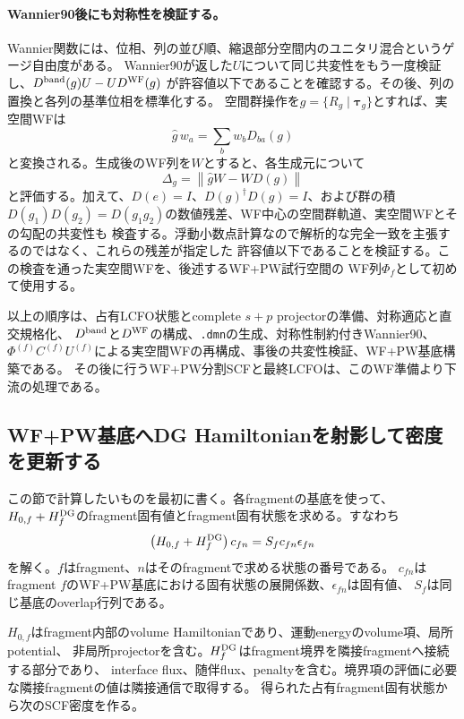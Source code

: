 \documentclass[11pt,a4paper]{article}
\newcommand{\code}[1]{\texttt{#1}}
\begin{document}
\paragraph{Wannier90後にも対称性を検証する。}
Wannier関数には、位相、列の並び順、縮退部分空間内のユニタリ混合というゲージ自由度がある。
Wannier90が返した$U$について同じ共変性をもう一度検証し、$D^{\rm band}(g)U-UD^{\rm WF}(g)$
が許容値以下であることを確認する。その後、列の置換と各列の基準位相を標準化する。
空間群操作を$g=\{R_g\mid\boldsymbol\tau_g\}$とすれば、実空間WFは
\begin{equation}
 \hat g\,w_a=\sum_b w_bD_{ba}(g)
 \label{eq:wannier-symmetry-action}
\end{equation}
と変換される。生成後のWF列を$W$とすると、各生成元について
\begin{equation}
 \Delta_g=\left\|\hat gW-WD(g)\right\|
 \label{eq:wannier-covariance-defect}
\end{equation}
と評価する。加えて、$D(e)=I$、$D(g)^\dagger D(g)=I$、および群の積
$D(g_1)D(g_2)=D(g_1g_2)$の数値残差、WF中心の空間群軌道、実空間WFとその勾配の共変性も
検査する。浮動小数点計算なので解析的な完全一致を主張するのではなく、これらの残差が指定した
許容値以下であることを検証する。この検査を通った実空間WFを、後述するWF+PW試行空間の
WF列$\Phi_f$として初めて使用する。

以上の順序は、占有LCFO状態とcomplete $s+p$ projectorの準備、対称適応と直交規格化、
$D^{\rm band}$と$D^{\rm WF}$の構成、\code{.dmn}の生成、対称性制約付きWannier90、
$\Phi^{(f)}C^{(f)}U^{(f)}$による実空間WFの再構成、事後の共変性検証、WF+PW基底構築である。
その後に行うWF+PW分割SCFと最終LCFOは、このWF準備より下流の処理である。

\subsection{WF+PW基底へDG Hamiltonianを射影して密度を更新する}
この節で計算したいものを最初に書く。各fragmentの基底を使って、
$H_{0,f}+H_f^{\rm DG}$のfragment固有値とfragment固有状態を求める。すなわち
\begin{equation}
 \left(H_{0,f}+H_f^{\rm DG}\right)c_{fn}=S_fc_{fn}\epsilon_{fn}
 \label{eq:fragment-dg-eigensystem-goal}
\end{equation}
を解く。$f$はfragment、$n$はそのfragmentで求める状態の番号である。
$c_{fn}$はfragment $f$のWF+PW基底における固有状態の展開係数、$\epsilon_{fn}$は固有値、
$S_f$は同じ基底のoverlap行列である。

$H_{0,f}$はfragment内部のvolume Hamiltonianであり、運動energyのvolume項、局所potential、
非局所projectorを含む。$H_f^{\rm DG}$はfragment境界を隣接fragmentへ接続する部分であり、
interface flux、随伴flux、penaltyを含む。境界項の評価に必要な隣接fragmentの値は隣接通信で取得する。
得られた占有fragment固有状態から次のSCF密度を作る。
\end{document}
